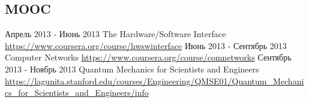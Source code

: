 \documentclass[11pt,a4paper]{moderncv}
\begin{document}
  \subsection{MOOC}
    \cventry
      {Апрель 2013 - Июнь 2013}
      {The Hardware/Software Interface}
      {\newline\url{https://www.coursera.org/course/hwswinterface}}
      {}{}{}
    \cventry
      {Июнь 2013 - Сентябрь 2013}
      {Computer Networks}
      {\newline\url{https://www.coursera.org/course/comnetworks}}
      {}{}{}
    \cventry
      {Сентябрь 2013 - Ноябрь 2013}
      {Quantum Mechanics for Scientists and Engineers}
      {\newline\url{https://lagunita.stanford.edu/courses/Engineering/QMSE01/Quantum_Mechanics_for_Scientists_and_Engineers/info}}
      {}{}{}
\end{document}
